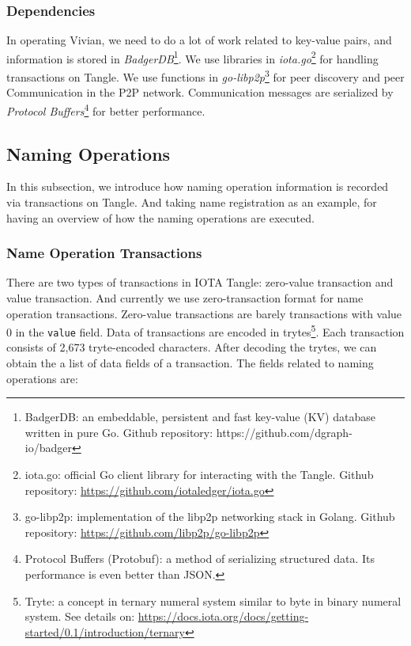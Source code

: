 \subsubsection{Dependencies} In operating Vivian, we need to do a lot of work related to key-value pairs, and information is stored in \textit{BadgerDB}\footnote{BadgerDB: an embeddable, persistent and fast key-value (KV) database written in pure Go. Github repository: https://github.com/dgraph-io/badger}.
We use libraries in \textit{iota.go}\footnote{iota.go: official Go client library for interacting with the Tangle. Github repository: \url{https://github.com/iotaledger/iota.go}} for handling transactions on Tangle.
We use functions in \textit{go-libp2p}\footnote{go-libp2p: implementation of the libp2p networking stack in Golang. Github repository: \url{https://github.com/libp2p/go-libp2p}} for peer discovery and peer Communication in the P2P network.
Communication messages are serialized by \textit{Protocol Buffers}\footnote{Protocol Buffers (Protobuf):  a method of serializing structured data. Its performance is even better than JSON.} for better performance.

\subsection{Naming Operations}
In this subsection, we introduce how naming operation information is recorded via transactions on Tangle. And taking name registration as an example, for having an overview of how the naming operations are executed.

\subsubsection{Name Operation Transactions} There are two types of transactions in IOTA Tangle: zero-value transaction and value transaction. And currently we use zero-transaction format for name operation transactions.
Zero-value transactions are barely transactions with value 0 in the \texttt{value} field.
Data of transactions are encoded in trytes\footnote{Tryte: a concept in ternary numeral system similar to byte in binary numeral system. See details on: \url{https://docs.iota.org/docs/getting-started/0.1/introduction/ternary}}.
Each transaction consists of 2,673 tryte-encoded characters. After decoding the trytes, we can obtain the a list of data fields of a transaction. The fields related to naming operations are:

